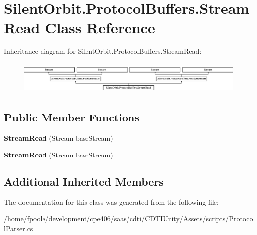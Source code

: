 \hypertarget{class_silent_orbit_1_1_protocol_buffers_1_1_stream_read}{}\section{Silent\+Orbit.\+Protocol\+Buffers.\+Stream\+Read Class Reference}
\label{class_silent_orbit_1_1_protocol_buffers_1_1_stream_read}
Inheritance diagram for Silent\+Orbit.\+Protocol\+Buffers.\+Stream\+Read\+:\begin{figure}[H]
\begin{center}
\leavevmode
\includegraphics[height=1.627907cm]{class_silent_orbit_1_1_protocol_buffers_1_1_stream_read}
\end{center}
\end{figure}
\subsection*{Public Member Functions}
\begin{DoxyCompactItemize}
\item 
\hypertarget{class_silent_orbit_1_1_protocol_buffers_1_1_stream_read_a79f15b6f4801903fe6f4043e89d1b932}{}{\bfseries Stream\+Read} (Stream base\+Stream)\label{class_silent_orbit_1_1_protocol_buffers_1_1_stream_read_a79f15b6f4801903fe6f4043e89d1b932}

\item 
\hypertarget{class_silent_orbit_1_1_protocol_buffers_1_1_stream_read_a79f15b6f4801903fe6f4043e89d1b932}{}{\bfseries Stream\+Read} (Stream base\+Stream)\label{class_silent_orbit_1_1_protocol_buffers_1_1_stream_read_a79f15b6f4801903fe6f4043e89d1b932}

\end{DoxyCompactItemize}
\subsection*{Additional Inherited Members}


The documentation for this class was generated from the following file\+:\begin{DoxyCompactItemize}
\item 
/home/fpoole/development/cpe406/saas/cdti/\+C\+D\+T\+I\+Unity/\+Assets/scripts/Protocol\+Parser.\+cs\end{DoxyCompactItemize}
